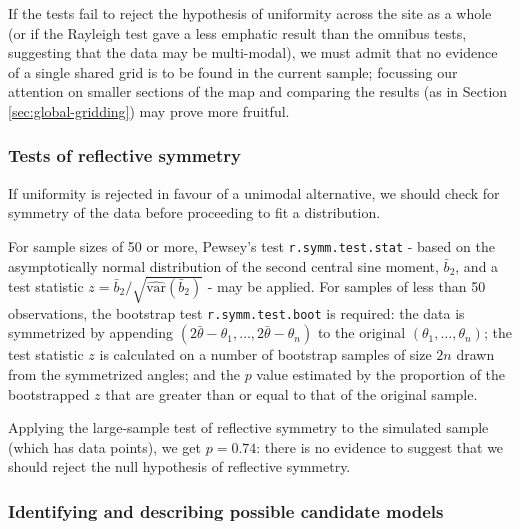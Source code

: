 \documentclass[../../ArchStats.tex]{subfiles}
\begin{document}
If the tests fail to reject the hypothesis of uniformity across the site as a whole (or if the Rayleigh test gave a less emphatic result than the omnibus tests, suggesting that the data may be multi-modal), we must admit that no evidence of a single shared grid is to be found in the current sample; focussing our attention on smaller sections of the map and comparing the results (as in Section \ref{sec:global-gridding}) may prove more fruitful. 


\subsubsection{Tests of reflective symmetry}
If uniformity is rejected in favour of a unimodal alternative, we should check for symmetry of the data before proceeding to fit a distribution. 

For sample sizes of 50 or more, Pewsey's test \texttt{r.symm.test.stat} - based on the asymptotically normal distribution of the second central sine moment, $\bar{b}_2$, and a test statistic $z = \bar{b}_2 / \sqrt{\widehat{\text{var}}(\bar{b}_2)}$ \cite{Pewsey2002} - may be applied. For samples of less than 50 observations, the bootstrap test \texttt{r.symm.test.boot} is required: the data is symmetrized by appending $(2\bar{\theta} - \theta_1, \dots, 2\bar{\theta} - \theta_n)$ to the original $(\theta_1, \dots, \theta_n)$; the test statistic $z$ is calculated on a number of bootstrap samples of size $2n$ drawn from the symmetrized angles; and the $p$ value estimated by the proportion of the bootstrapped $z$ that are greater than or equal to that of the original sample.

Applying the large-sample test of reflective symmetry to the simulated sample (which has  data points), we get $p = 0.74$: there is no evidence to suggest that we should reject the null hypothesis of reflective symmetry.


\subsubsection{Identifying and describing possible candidate models}

\end{document}
